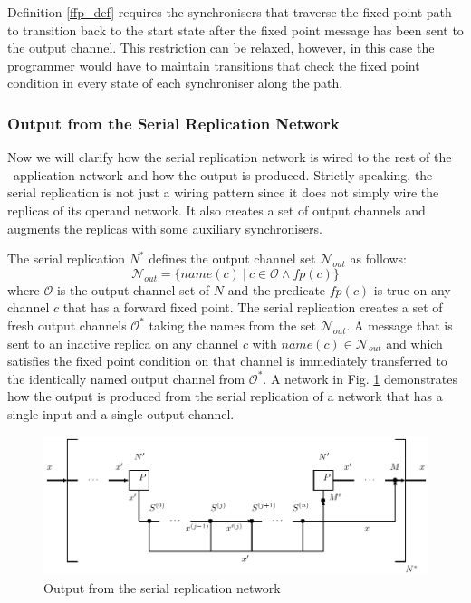 Definition \ref{ffp_def} requires the synchronisers that traverse the fixed point path to transition back to the start state after the fixed point message has been sent to the output channel. This restriction can be relaxed, however, in this case the programmer would have to maintain transitions that check the fixed point condition in every state of each synchroniser along the path.


    \subsubsection{Output from the Serial Replication Network}
Now we will clarify how the serial replication network is wired to the rest of the \ak\ application network and how the output is produced. Strictly speaking, the serial replication is not just a wiring pattern since it does not simply wire the replicas of its operand network. It also creates a set of output channels and augments the replicas with some auxiliary synchronisers.

The serial replication $N^{*}$ defines the output channel set $\mathcal{N}_{out}$ as follows:
\begin{equation}
\mathcal{N}_{out} = \{ name(c) \: | \: c \in \mathcal{O} \land fp(c) \}\nonumber
\end{equation}
where $\mathcal{O}$ is the output channel set of $N$ and the predicate $fp(c)$ is true on any channel $c$ that has a forward fixed point. The serial replication creates a set of fresh output channels $\mathcal{O}^{*}$ taking the names from the set $\mathcal{N}_{out}$. A message that is sent to an inactive replica on any channel $c$ with $name(c) \in \mathcal{N}_{out}$ and which satisfies the fixed point condition on that channel is immediately transferred to the identically named output channel from $\mathcal{O}^{*}$. A network in Fig. \ref{fig:ffp_out} demonstrates how the output is produced from the serial replication of a network that has a single input and a single output channel.

\begin{figure}[h!]
\centering
\includegraphics[scale=0.8]{figs/chapter_04_ffp_out.pdf}
\caption{Output from the serial replication network}
\label{fig:ffp_out}
\end{figure}

